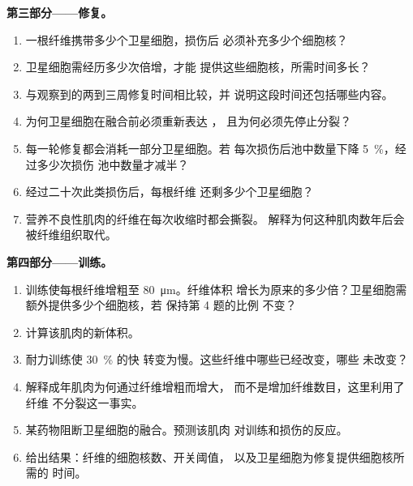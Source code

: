 \begin{problem}
\medskip
\noindent\textbf{第三部分——修复。}
\begin{enumerate}[resume]
  \item 一根纤维携带多少个卫星细胞，损伤后
        必须补充多少个细胞核？
  \item 卫星细胞需经历多少次倍增，才能
        提供这些细胞核，所需时间多长？
  \item 与观察到的两到三周修复时间相比较，并
        说明这段时间还包括哪些内容。
  \item 为何卫星细胞在融合前必须重新表达 ，
        且为何必须先停止分裂？
  \item 每一轮修复都会消耗一部分卫星细胞。若
        每次损伤后池中数量下降 \qty{5}{\%}，经过多少次损伤
        池中数量才减半？
  \item 经过二十次此类损伤后，每根纤维
        还剩多少个卫星细胞？
  \item 营养不良性肌肉的纤维在每次收缩时都会撕裂。
        解释为何这种肌肉数年后会被纤维组织取代。
\end{enumerate}

\medskip
\noindent\textbf{第四部分——训练。}
\begin{enumerate}[resume]
  \item 训练使每根纤维增粗至 \qty{80}{\micro m}。纤维体积
        增长为原来的多少倍？卫星细胞需额外提供多少个细胞核，若
        保持第 4 题的比例
        不变？
  \item 计算该肌肉的新体积。
  \item 耐力训练使 \qty{30}{\%} 的快
        转变为慢。这些纤维中哪些已经改变，哪些
        未改变？
  \item 解释成年肌肉为何通过纤维增粗而增大，
        而不是增加纤维数目，这里利用了纤维
        不分裂这一事实。
  \item 某药物阻断卫星细胞的融合。预测该肌肉
        对训练和损伤的反应。
  \item 给出结果：纤维的细胞核数、开关阈值，
        以及卫星细胞为修复提供细胞核所需的
        时间。
\end{enumerate}
\end{problem}
